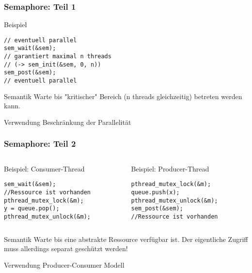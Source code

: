 \documentclass[xcolor=pdftex,dvipsnames,table]{beamer}
\begin{document}
\begin{frame}[fragile]
	\frametitle{Semaphore: Teil 1}
	\begin{block}{Beispiel}
		\begin{lstlisting}	
// eventuell parallel
sem_wait(&sem);
// garantiert maximal n threads 
// (-> sem_init(&sem, 0, n))
sem_post(&sem);
// eventuell parallel
		\end{lstlisting}
	\end{block}
	
	\begin{block}{Semantik}
		Warte bis "kritischer" Bereich (n threads gleichzeitig) betreten werden kann.
	\end{block}	
	
	\begin{block}{Verwendung}
		Beschränkung der Parallelität
	\end{block}	
\end{frame}

\begin{frame}[fragile]
	\frametitle{Semaphore: Teil 2}
	
	\begin{columns}
		\begin{column}{0.52\textwidth}
			\begin{block}{Beispiel: Consumer-Thread}
			\begin{lstlisting}	
sem_wait(&sem);
//Ressource ist vorhanden
pthread_mutex_lock(&m);
y = queue.pop();
pthread_mutex_unlock(&m);
			\end{lstlisting}
			\end{block}
		\end{column}
		\begin{column}{0.52\textwidth}
		\begin{block}{Beispiel: Producer-Thread}
			\begin{lstlisting}	
pthread_mutex_lock(&m);
queue.push(x);
pthread_mutex_unlock(&m);
sem_post(&sem);
//Ressource ist vorhanden
			\end{lstlisting}
		\end{block}
		\end{column}
	\end{columns}
	
	\begin{block}{Semantik}
		Warte bis eine abstrakte Ressource verfügbar ist. Der eigentliche Zugriff muss allerdings separat geschützt werden!
	\end{block}	
	
	\begin{block}{Verwendung}
		Producer-Consumer Modell
	\end{block}	
\end{frame}
\end{document}
